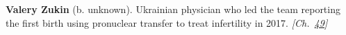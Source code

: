\textbf{Valery Zukin} (b. unknown). Ukrainian physician who led the team reporting the first birth using pronuclear transfer to treat infertility in 2017. \emph{[Ch.~\hyperref[ch:ivfmtdna]{49}]}

